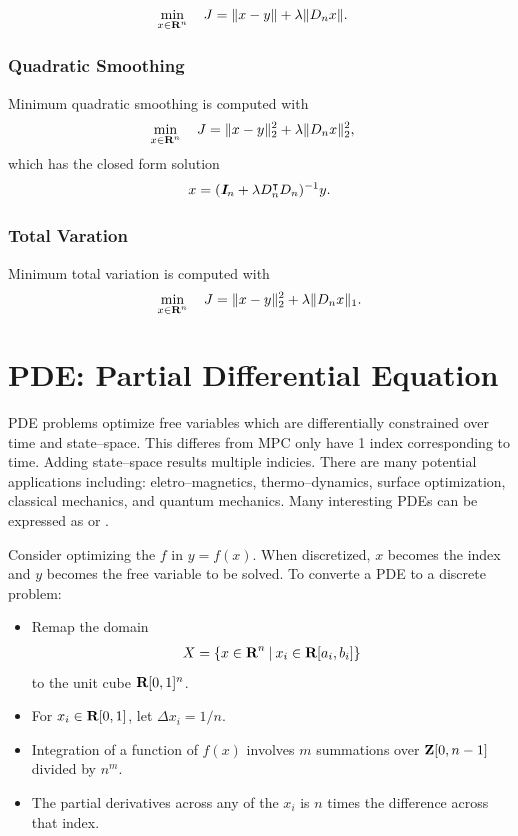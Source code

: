 \documentclass{article}
\begin{document}
    \begin{align}
        \min_{x\in\textbf{R}^n}\quad J &= \|x-y\|+\lambda \|D_nx\|.
    \end{align}
    \subsubsection{Quadratic Smoothing}
    Minimum quadratic smoothing is computed with
    \begin{align*}
        \min_{x\in\textbf{R}^n}\quad J &= \|x-y\|_2^2+\lambda \|D_nx\|_2^2,
    \end{align*}
    which has the closed form solution
    \begin{align*}
        x=(\emph{\textbf{I}}_n+\lambda D_n^\intercal D_n)^{-1}y.
    \end{align*}
    \subsubsection{Total Varation}
    Minimum total variation is computed with
    \begin{align*}
        \min_{x\in\textbf{R}^n}\quad J = \|x-y\|_2^2+\lambda \|D_nx\|_1.
    \end{align*}

\clearpage
\section{PDE: Partial Differential Equation}

    PDE problems optimize free variables which are differentially 
    constrained over time and state--space.
    This differes from MPC only have 1 index corresponding to time.  
    Adding state--space results multiple indicies.
    There are many potential applications including:
    eletro--magnetics, thermo--dynamics, surface optimization, classical mechanics, 
    and quantum mechanics. Many interesting PDEs can be expressed as \LP or \QP. 
    
    Consider optimizing the $f$ in $y=f(x)$.  When discretized, $x$ becomes the index
    and $y$ becomes the free variable to be solved.
    To converte a PDE to a discrete problem:
    \begin{itemize}
        \item Remap the domain 
            \begin{align*}
            X=\{x\in\textbf{R}^n\:|\:x_i\in\textbf{R}[a_i,b_i]\}
        \end{align*}
            to the unit cube $\textbf{R}[0,1]^n$.
        \item For $x_i\in\textbf{R}[0,1]$, let $\Delta x_i=1/n$.
        \item Integration of a function of $f(x)$ involves $m$ summations over $\textbf{Z}[0,n-1]$ divided by $n^m$.
        \item The partial derivatives across any of the $x_i$ is $n$ times the difference across that index.
    \end{itemize}
\end{document}
